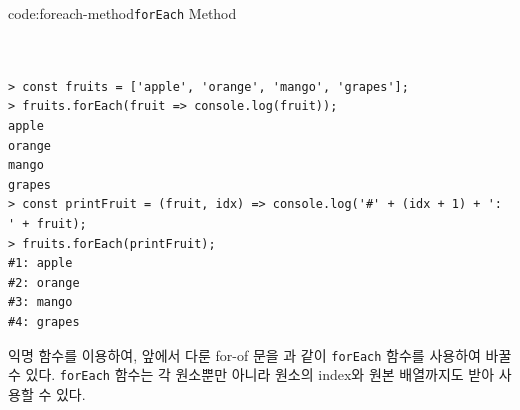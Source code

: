 \begin{codeenv}{code:foreach-method}{\texttt{forEach} Method}\begin{verbatim}


> const fruits = ['apple', 'orange', 'mango', 'grapes'];
> fruits.forEach(fruit => console.log(fruit));
apple
orange
mango
grapes
> const printFruit = (fruit, idx) => console.log('#' + (idx + 1) + ': ' + fruit);
> fruits.forEach(printFruit);
#1: apple
#2: orange
#3: mango
#4: grapes
\end{verbatim}
\end{codeenv}

익명 함수를 이용하여, 앞에서 다룬 for-of 문을 과 같이 \texttt{forEach} 함수를 사용하여 바꿀 수 있다. \texttt{forEach} 함수는 각 원소뿐만 아니라 원소의 index와 원본 배열까지도 받아 사용할 수 있다.
